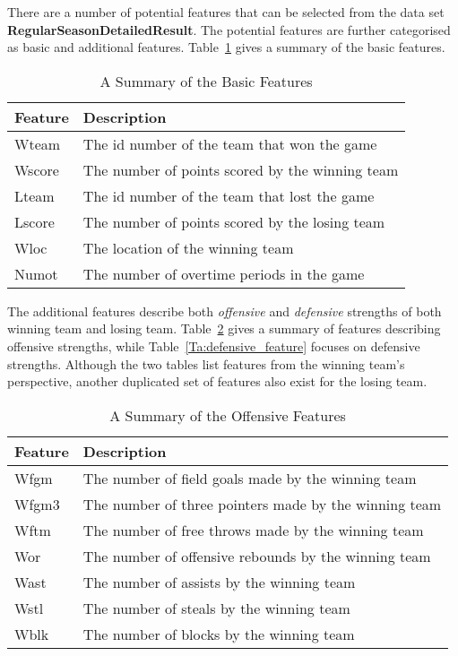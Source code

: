There are a number of potential features that can be selected from the data set \textbf{RegularSeasonDetailedResult}. The potential features are further categorised as basic and additional features. Table~\ref{Ta:basic_feature} gives a summary of the basic features. 

\begin{table}[h!]
\centering
\begin{tabular}{ | l | l | }
\hline
\textbf{Feature} & \textbf{Description} \\ \hline
Wteam & The id number of the team that won the game \\ \hline
Wscore & The number of points scored by the winning team \\ \hline
Lteam & The id number of the team that lost the game \\ \hline
Lscore & The number of points scored by the losing team \\ \hline
Wloc & The location of the winning team \\ \hline
Numot & The number of overtime periods in the game \\ \hline
\end{tabular}
\caption{A Summary of the Basic Features}\label{Ta:basic_feature}
\end{table}

The additional features describe both \emph{offensive} and \emph{defensive} strengths of both winning team and losing team. Table~\ref{Ta:offensive_feature} gives a summary of features describing offensive strengths, while Table~\ref{Ta:defensive_feature} focuses on defensive strengths. Although the two tables list features from the winning team's perspective, another duplicated set of features also exist for the losing team. 

\begin{table}[h!]
\centering
\begin{tabular}{ | l | l | }
\hline
\textbf{Feature} & \textbf{Description} \\ \hline
Wfgm & The number of field goals made by the winning team\\ \hline
Wfgm3 & The number of three pointers made by the winning team \\ \hline
Wftm & The number of free throws made by the winning team \\ \hline
Wor & The number of offensive rebounds by the winning team \\ \hline
Wast & The number of assists by the winning team \\ \hline
Wstl & The number of steals by the winning team \\ \hline
Wblk & The number of blocks by the winning team \\ \hline
\end{tabular}
\caption{A Summary of the Offensive Features}\label{Ta:offensive_feature}
\end{table}

